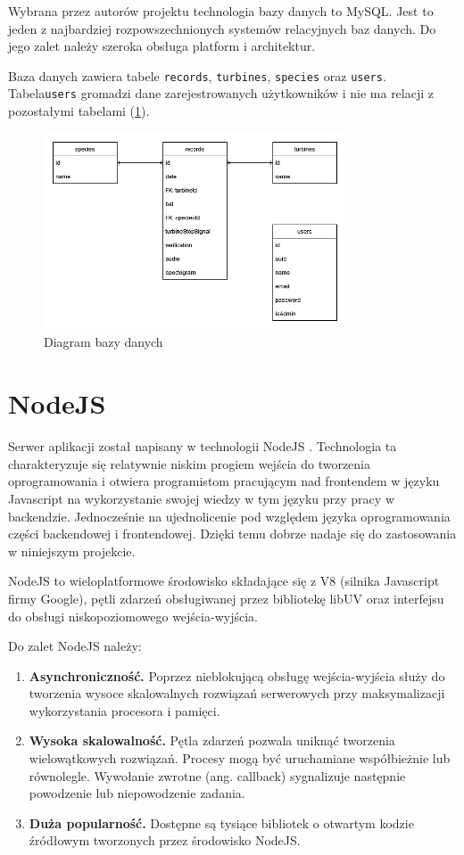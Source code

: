 \documentclass{sprz}
\begin{document}
Wybrana przez autorów projektu technologia bazy danych to MySQL. Jest to jeden z najbardziej rozpowszechnionych systemów relacyjnych baz danych. Do jego zalet należy szeroka obsługa platform i architektur.

Baza danych zawiera tabele \verb|records|, \verb|turbines|, \verb|species| oraz \verb|users|. Tabela\verb|users| gromadzi dane zarejestrowanych użytkowników i nie ma relacji z pozostałymi tabelami (\ref{img:db_diagram}).

\begin{figure}[h]
  \centering
  \includegraphics[width=0.8\textwidth]{sprz/db_diagram}
  \caption{Diagram bazy danych}
  \label{img:db_diagram}
\end{figure}

\section{NodeJS}

Serwer aplikacji został napisany w technologii NodeJS \cite{nodejs}. Technologia ta charakteryzuje się relatywnie niskim progiem wejścia do tworzenia oprogramowania i otwiera programistom pracującym nad frontendem w języku Javascript na wykorzystanie swojej wiedzy w tym języku przy pracy w backendzie. Jednocześnie na ujednolicenie pod względem języka oprogramowania części backendowej i frontendowej. Dzięki temu dobrze nadaje się do zastosowania w niniejszym projekcie.

NodeJS to wieloplatformowe środowisko składające się z V8 (silnika Javascript firmy Google), pętli zdarzeń obsługiwanej przez bibliotekę libUV oraz interfejsu do obsługi niskopoziomowego wejścia-wyjścia.

Do zalet NodeJS należy:
\begin{enumerate}
  \item \textbf{Asynchroniczność.} Poprzez nieblokującą obsługę wejścia-wyjścia służy do tworzenia wysoce skalowalnych rozwiązań serwerowych przy maksymalizacji wykorzystania procesora i pamięci.
  \item \textbf{Wysoka skalowalność.} Pętla zdarzeń pozwala uniknąć tworzenia wielowątkowych rozwiązań. Procesy mogą być uruchamiane współbieżnie lub równolegle. Wywołanie zwrotne (ang. callback) sygnalizuje następnie powodzenie lub niepowodzenie zadania.
  \item \textbf{Duża popularność.} Dostępne są tysiące bibliotek o otwartym kodzie źródłowym tworzonych przez środowisko NodeJS.
\end{enumerate}
\end{document}
